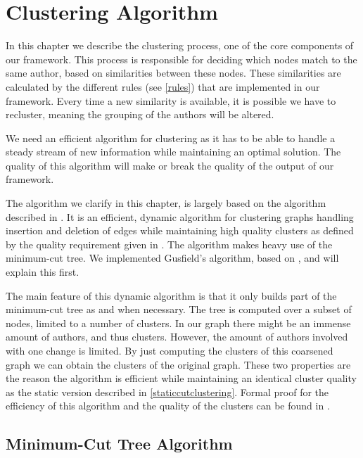 \chapter{Clustering Algorithm}

In this chapter we describe the clustering process, one of the core components of our framework. This process is responsible for deciding which nodes match to the same author, based on similarities between these nodes. These similarities are calculated by the different rules (see \autoref{rules}) that are implemented in our framework. Every time a new similarity is available, it is possible we have to recluster, meaning the grouping of the authors will be altered.

We need an efficient algorithm for clustering as it has to be able to handle a steady stream of new information while maintaining an optimal solution. The quality of this algorithm will make or break the quality of the output of our framework.

The algorithm we clarify in this chapter, is largely based on the algorithm described in \cite{saha2006dynamic}. It is an efficient, dynamic algorithm for clustering graphs handling insertion and deletion of edges while maintaining high quality clusters as defined by the quality requirement given in \cite{flake2004graph}. The algorithm makes heavy use of the minimum-cut tree. We implemented Gusfield's algorithm, based on \cite{rodrigues2011mpi}, and will explain this first.

The main feature of this dynamic algorithm is that it only builds part of the minimum-cut tree as and when necessary. The tree is computed over a subset of nodes, limited to a number of clusters. In our graph there might be an immense amount of authors, and thus clusters. However, the amount of authors involved with one change is limited. By just computing the clusters of this coarsened graph we can obtain the clusters of the original graph. These two properties are the reason the algorithm is efficient while maintaining an identical cluster quality as the static version described in \autoref{staticcutclustering}. Formal proof for the efficiency of this algorithm and the quality of the clusters can be found in \cite{saha2006dynamic}.

\section{Minimum-Cut Tree Algorithm}
\label{minimumcuttree}


